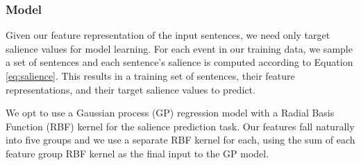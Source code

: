 \subsubsection{Model}
Given our feature representation of the input sentences, we need only target 
salience values for model learning. 
For each event in our training data, we sample a set of sentences and  each 
sentence's salience is computed according to Equation \ref{eq:salience}.
This results in a training set of sentences, their feature representations,
and their target salience values to predict.

We opt to use a Gaussian process (GP) regression model
\cite{rasmussen:gaussian-process-book} with a Radial Basis Function (RBF) 
kernel for the salience prediction task.  
Our features fall naturally into five groups and we use a separate RBF kernel
for each, using the sum of each feature group RBF kernel as the final input
to the GP model.


%






